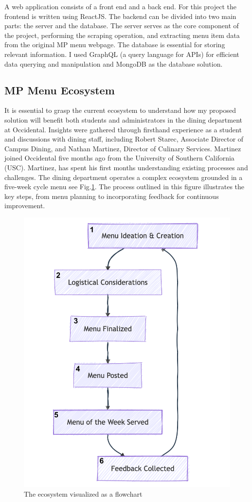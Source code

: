 \documentclass[10pt,twocolumn]{article}
\begin{document}
A web application consists of a front end and a back end. For this project the frontend is written using ReactJS. The backend can be divided into two main parts: the server and the database. The server serves as the core component of the project, performing the scraping operation, and extracting menu item data from the original MP menu webpage. The database is essential for storing relevant information. I used GraphQL (a query language for APIs) for efficient data querying and manipulation and MongoDB as the database solution.


\subsection{MP Menu Ecosystem}
It is essential to grasp the current ecosystem to understand how my proposed solution will benefit both students and administrators in the dining department at Occidental. Insights were gathered through firsthand experience as a student and discussions with dining staff, including Robert Starec, Associate Director of Campus Dining, and Nathan Martinez, Director of Culinary Services. Martinez joined Occidental five months ago from the University of Southern California (USC). Martinez, has spent his first months understanding existing processes and challenges. The dining department operates a complex ecosystem grounded in a five-week cycle menu see Fig.\ref{mp-ecosystem}. The process outlined in this figure illustrates the key steps, from menu planning to incorporating feedback for continuous improvement.

    \begin{figure}[htbp]
    \centering
    \includegraphics[width=.55\linewidth]{images/mp-ecosystem.png} %
    \caption{
        The ecosystem visualized as a flowchart
    }\label{mp-ecosystem}
\end{figure}
\end{document}
